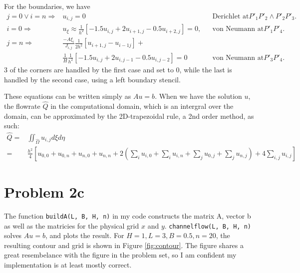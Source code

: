 \documentclass[aps, 12pt]{revtex4}
\begin{document}
For the boundaries, we have
\begin{align*}
    j=0 \lor i=n \Rightarrow & u_{i, j} = 0                                                                     &  & \text{Derichlet at} P'_1P'_2\land P'_2P'_3.
    \\
    i = 0 \Rightarrow        & u_{\xi} \approx \frac{1}{h^2}\left[-1.5u_{i,j}+2u_{i+1,j}-0.5u_{i+2,j}\right]=0, &  & \text{von Neumann at} P'_1P'_4.
    \\
    j =n\Rightarrow          & \frac{-A\xi_i}{J_{i,j}}\frac{1}{2h^2}\left[u_{i+1,j}-u_{i-1j}\right] +
    \\
                             & \frac{1}{H}\frac{1}{h^2}\left[-1.5u_{i,j}+2u_{i,j-1}-0.5u_{i,j-2}\right]=0       &  & \text{von Neumann at} P'_3P'_4.
\end{align*}
3 of the corners are handled by the first case and set to $0$, while the last is handled by the second case, using a left boundary stencil.

These equations can be written simply as $Au=b$. When we have the solution $u$, the flowrate $\hat{Q}$ in the computational domain, which is an intergral over the domain, can be approximated by the 2D-trapezoidal rule, a 2nd order method, as such: \cite{trap}
\begin{align*}
    \hat{Q} = & \iint_{\hat{\Omega}}u_{i,j}d\xi d\eta
    \\
    =         & \frac{h^2}{4}\left[u_{0,0}+u_{0,n}+u_{n,0}+u_{n,n} + 2\left(\sum_iu_{i,0}+\sum_iu_{i,n}+\sum_ju_{0,j}+\sum_ju_{n,j}\right)+4\sum_{i,j}u_{i,j} \right]
\end{align*}

\section*{Problem 2c}

The function \texttt{buildA(L, B, H, n)} in my code constructs the matrix A, vector b as well as the matricies for the physical grid $x$ and $y$. \texttt{channelflow(L, B, H, n)} solves $Au=b$, and plots the result. For $H=1, L=3, B=0.5, n=20$, the resulting contour and grid is shown in Figure \ref{fig:contour}. The figure shares a great resembelance with the figure in the problem set, so I am confident my implementation is at least mostly correct.
\end{document}

